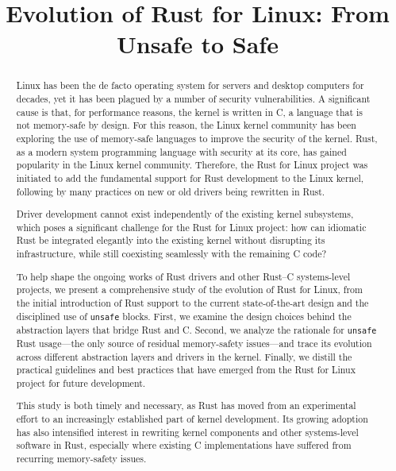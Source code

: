\documentclass[conference]{IEEEtran}
\begin{document}
\title{Evolution of Rust for Linux: From Unsafe to Safe}

\author{
}

\maketitle

\begin{abstract}
Linux has been the de facto operating system for servers and desktop computers for decades, yet it has been plagued by a number of security vulnerabilities.
A significant cause is that, for performance reasons, the kernel is written in C, a language that is not memory-safe by design. For this reason, the Linux kernel community has been exploring the use of memory-safe languages to improve the security of the kernel.
Rust, as a modern system programming language with security at its core, has gained popularity in the Linux kernel community. Therefore, the Rust for Linux project was initiated to add the fundamental support for Rust development to the Linux kernel, following by many practices on new or old drivers being rewritten in Rust.

Driver development cannot exist independently of the existing kernel subsystems, which poses a significant challenge for the Rust for Linux project: how can idiomatic Rust be integrated elegantly into the existing kernel without disrupting its infrastructure, while still coexisting seamlessly with the remaining C code? 


To help shape the ongoing works of Rust drivers and other Rust--C
systems-level projects, we present a comprehensive study of the evolution
of Rust for Linux, from the initial introduction of Rust support to the
current state-of-the-art design and the disciplined use of \texttt{unsafe}
blocks. 
First, we examine the design choices behind the abstraction layers
that bridge Rust and C. 
Second, we analyze the rationale for \texttt{unsafe}
Rust usage---the only source of residual memory-safety issues---and
trace its evolution across different abstraction layers and drivers in the kernel.
Finally, we distill the practical guidelines and best practices
that have emerged from the Rust for Linux project for future development.

This study is both timely and necessary, as Rust has moved from an
experimental effort to an increasingly established part of kernel development.
Its growing adoption has also intensified interest in rewriting kernel
components and other systems-level software in Rust, especially where existing
C implementations have suffered from recurring memory-safety issues.


\end{abstract}
\end{document}
